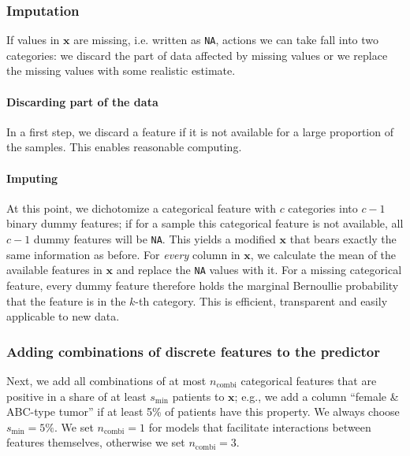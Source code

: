 \subsubsection{Imputation}

If values in $\mathbf{x}$ are missing, i.e. written as \texttt{NA}, actions we can take fall into two 
categories: we discard the part of data affected by missing values or we replace the missing values 
with some realistic estimate.

\paragraph{Discarding part of the data}

In a first step, we discard a feature if it is not available for a large proportion of the samples.
This enables reasonable computing.

\paragraph{Imputing}

At this point, we dichotomize a categorical 
feature with $c$ categories into $c-1$ binary dummy features; if for a sample this categorical feature is not 
available, all $c-1$ dummy features will be \texttt{NA}. This yields a modified $\mathbf{x}$ that 
bears exactly the same information as before. For \textit{every} column in $\mathbf{x}$, we calculate the 
mean of the available features in $\mathbf{x}$ and replace the \texttt{NA} values with it. 
For a missing categorical feature, every dummy feature therefore holds the marginal Bernoullie 
probability that the feature is in the $k$-th category. This is efficient, transparent and easily 
applicable to new data.

\subsubsection{Adding combinations of discrete features to the predictor}

Next, we add all combinations of at most $n_\text{combi}$ categorical features that are positive in a 
share of at least $s_\text{min}$ patients to $\mathbf{x}$; e.g., we add a column ``female \& ABC-type 
tumor'' if at least \num{5}\% of patients have this property. We always choose $s_\text{min}
= 5\%$. We set $n_\text{combi} = 1$ for models that facilitate interactions between features 
themselves, otherwise we set $n_\text{combi} = 3$.


